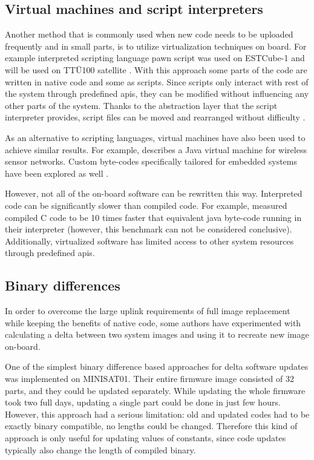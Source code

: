 \subsection{Virtual machines and script interpreters}

Another method that is commonly used when new code needs to be uploaded frequently and in small parts, is to utilize virtualization techniques on board. For example interpreted scripting language pawn script was used on ESTCube-1 \cite{Suenter2016} and will be used on TTÜ100 satellite \cite{Aasavaeli2017}. With this approach some parts of the code are written in native code and some as scripts. Since scripts only interact with rest of the system through predefined \glspl{api}, they can be modified without influencing any other parts of the system. Thanks to the abstraction layer that the script interpreter provides, script files can be moved and rearranged without difficulty \cite{Riemersm}.

As an alternative to scripting languages, virtual machines have also been used to achieve similar results. For example, \textcite{Simon2006} describes a Java virtual machine for wireless sensor networks. Custom byte-codes specifically tailored for embedded systems have been explored as well \cite{Levis2002}.

However, not all of the on-board software can be rewritten this way. Interpreted code can be significantly slower than compiled code. For example, \textcite{Simon2006} measured compiled C code to be 10 times faster that equivalent java byte-code running in their interpreter (however, this benchmark can not be considered conclusive). Additionally, virtualized software has limited access to other system resources through predefined \glspl{api}.

\subsection{Binary differences}

In order to overcome the large uplink requirements of full image replacement while keeping the benefits of native code, some authors have experimented with calculating a delta between two system images and using it to recreate new image on-board.

One of the simplest binary difference based approaches for delta software updates was implemented on MINISAT01. Their entire firmware image consisted of 32 parts, and they could be updated separately. While updating the whole firmware took two full days, updating a single part could be done in just few hours. However, this approach had a serious limitation: old and updated codes had to be exactly binary compatible, no lengths could be changed. Therefore this kind of approach is only useful for updating values of constants, since code updates typically also change the length of compiled binary. \cite{Garrido1998}

